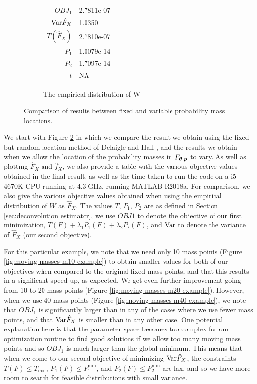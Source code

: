 \begin{figure}
\begin{subfigure}[b]{0.49\textwidth}
		\begin{tabular}{r l}
			$OBJ_1$ & 2.7811e-07\\
			$\mathrm{Var} \hat{F}_X$ & 1.0350\\
			$T(\hat{F}_X)$ & 2.7810e-07\\
			$P_1$ & 1.0079e-14\\
			$P_2$ & 1.7097e-14\\
			$t$ & NA
		\end{tabular}
		\caption{The empirical distribution of W}
		\label{fig:emp masses example}
	\end{subfigure}
	
	\caption{Comparison of results between fixed and variable probability mass locations.}
	\label{fig:compare fixed moving masses}
\end{figure}

We start with Figure \ref{fig:compare fixed moving masses} in which we compare the result we obtain using the fixed but random location method of Delaigle and Hall \cite{Delaigle2016-la}, and the results we obtain when we allow the location of the probability masses in $F_{{\bm{{\theta}}}, {\bm{{p}}}}$ to vary. As well as plotting $\hat{F}_X$ and $\hat{f}_X$, we also provide a table with the various objective values obtained in the final result, as well as the time taken to run the code on a i5-4670K CPU running at 4.3 GHz, running MATLAB R2018a. For comparison, we also give the various objective values obtained when using the empirical distribution of $W$ as $\hat{F}_X$. The values $T$, $P_1$, $P_2$ are as defined in Section \ref{sec:deconvolution estimator}, we use $OBJ1$ to denote the objective of our first minimization, $T(F) + \lambda_1 P_1(F) + \lambda_2 P_2(F)$, and $\mathrm{Var}$ to denote the variance of $\hat{F}_X$ (our second objective).

For this particular example, we note that we need only 10 mass points (Figure \ref{fig:moving masses m10 example}) to obtain smaller values for both of our objectives when compared to the original fixed mass points, and that this results in a significant speed up, as expected. We get even further improvement going from 10 to 20 mass points (Figure \ref{fig:moving masses m20 example}). However, when we use 40 mass points (Figure \ref{fig:moving masses m40 example}), we note that $OBJ_1$ is significantly larger than in any of the cases where we use fewer mass points, and that $\mathrm{Var}\hat{F}_X$ is smaller than in any other case. One potential explanation here is that the parameter space becomes too complex for our optimization routine to find good solutions if we allow too many moving mass points and so $OBJ_1$ is much larger than the global minimum. This means that when we come to our second objective of minimizing $\mathrm{Var} \hat{F}_X$, the constraints $T(F) \leq T_\mathrm{min}$, $P_1(F) \leq P_1^\mathrm{min}$, and $P_2(F) \leq P_2^\mathrm{min}$ are lax, and so we have more room to search for feasible distributions with small variance.

